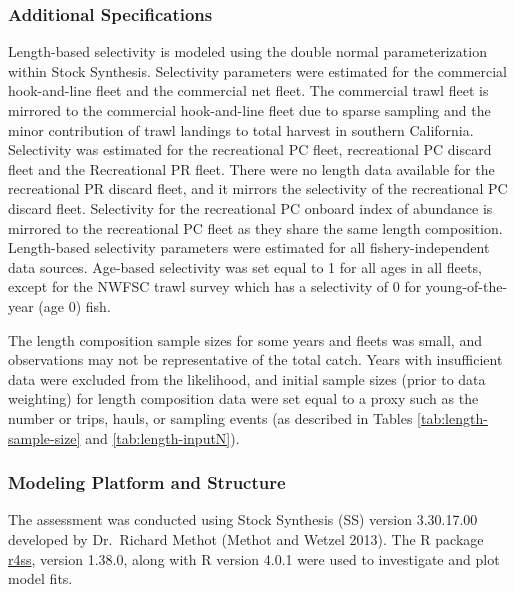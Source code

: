 \documentclass[11pt,
  english,
]{article}
\begin{document}

\hypertarget{additional-specifications}{%
\subsubsection{Additional Specifications}\label{additional-specifications}}

\leavevmode\tagmcend\tagstructend

Length-based selectivity is modeled using the double normal parameterization within Stock Synthesis. Selectivity parameters were estimated for the commercial hook-and-line fleet and the commercial net fleet. The commercial trawl fleet is mirrored to the commercial hook-and-line fleet due to sparse sampling and the minor contribution of trawl landings to total harvest in southern California. Selectivity was estimated for the recreational PC fleet, recreational PC discard fleet and the Recreational PR fleet. There were no length data available for the recreational PR discard fleet, and it mirrors the selectivity of the recreational PC discard fleet. Selectivity for the recreational PC onboard index of abundance is mirrored to the recreational PC fleet as they share the same length composition. Length-based selectivity parameters were estimated for all fishery-independent data sources. Age-based selectivity was set equal to 1 for all ages in all fleets, except for the NWFSC trawl survey which has a selectivity of 0 for young-of-the-year (age 0) fish.

The length composition sample sizes for some years and fleets was small, and observations may not be representative of the total catch. Years with insufficient data were excluded from the likelihood, and initial sample sizes (prior to data weighting) for length composition data were set equal to a proxy such as the number or trips, hauls, or sampling events (as described in Tables \ref{tab:length-sample-size} and \ref{tab:length-inputN}).


\hypertarget{modeling-platform-and-structure}{%
\subsubsection{Modeling Platform and Structure}\label{modeling-platform-and-structure}}

\leavevmode\tagmcend\tagstructend

The assessment was conducted using Stock Synthesis (SS) version 3.30.17.00 developed by Dr.~Richard Methot {(Methot and Wetzel 2013)\leavevmode\tagmcend\tagstructend}. The R package {\href{https://github.com/r4ss/r4ss}{r4ss}\leavevmode\tagmcend\tagstructend}, version 1.38.0, along with R version 4.0.1 were used to investigate and plot model fits.
\end{document}
